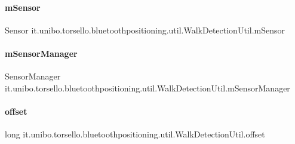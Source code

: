 \paragraph{\texorpdfstring{m\+Sensor}{mSensor}}
{\footnotesize\ttfamily Sensor it.\+unibo.\+torsello.\+bluetoothpositioning.\+util.\+Walk\+Detection\+Util.\+m\+Sensor\hspace{0.3cm}{\ttfamily [private]}}

\hypertarget{classit_1_1unibo_1_1torsello_1_1bluetoothpositioning_1_1util_1_1WalkDetectionUtil_afa8539715b8ef707d07c16e1ff27050d_afa8539715b8ef707d07c16e1ff27050d}{}\label{classit_1_1unibo_1_1torsello_1_1bluetoothpositioning_1_1util_1_1WalkDetectionUtil_afa8539715b8ef707d07c16e1ff27050d_afa8539715b8ef707d07c16e1ff27050d} 
\paragraph{\texorpdfstring{m\+Sensor\+Manager}{mSensorManager}}
{\footnotesize\ttfamily Sensor\+Manager it.\+unibo.\+torsello.\+bluetoothpositioning.\+util.\+Walk\+Detection\+Util.\+m\+Sensor\+Manager\hspace{0.3cm}{\ttfamily [private]}}

\hypertarget{classit_1_1unibo_1_1torsello_1_1bluetoothpositioning_1_1util_1_1WalkDetectionUtil_a9c7ff2a6d6247e292dee0bc18512c6d7_a9c7ff2a6d6247e292dee0bc18512c6d7}{}\label{classit_1_1unibo_1_1torsello_1_1bluetoothpositioning_1_1util_1_1WalkDetectionUtil_a9c7ff2a6d6247e292dee0bc18512c6d7_a9c7ff2a6d6247e292dee0bc18512c6d7} 
\paragraph{\texorpdfstring{offset}{offset}}
{\footnotesize\ttfamily long it.\+unibo.\+torsello.\+bluetoothpositioning.\+util.\+Walk\+Detection\+Util.\+offset\hspace{0.3cm}{\ttfamily [private]}}

